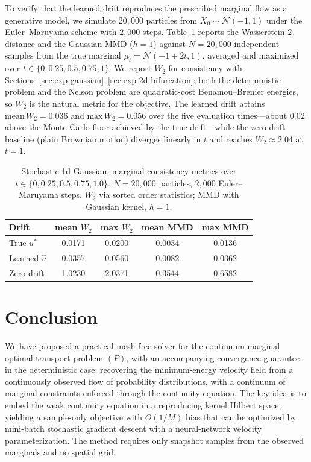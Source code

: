 \documentclass[11pt,leqno]{article}
\theoremstyle{plain}
\theoremstyle{remark}
\theoremstyle{definition}
\numberwithin{equation}{section}
\numberwithin{figure}{section}
\numberwithin{table}{section}
\begin{document}
To verify that the learned drift reproduces the prescribed marginal
flow as a generative model, we simulate $20{,}000$ particles from
$X_0\sim\mathcal{N}(-1,1)$ under the Euler--Maruyama scheme 
with $2{,}000$ steps.  Table~\ref{tab:marginal} reports the
Wasserstein-$2$ distance and the Gaussian MMD ($h=1$) against
$N=20{,}000$ independent samples from the true marginal
$\mu_t=\mathcal{N}(-1+2t,1)$, averaged and maximized over
$t\in\{0,0.25,0.5,0.75,1\}$.  We report $W_2$ for consistency with
Sections~\ref{sec:exp-gaussian}--\ref{sec:exp-2d-bifurcation}: both the
deterministic problem and the Nelson problem are quadratic-cost
Benamou--Brenier energies, so $W_2$ is the natural metric for the
objective.  The learned drift attains
$\mathrm{mean}\,W_2=0.036$ and $\mathrm{max}\,W_2=0.056$ over the five
evaluation times---about $0.02$ above the Monte Carlo floor achieved
by the true drift---while the zero-drift baseline (plain Brownian
motion) diverges linearly in $t$ and reaches $W_2\approx 2.04$ at
$t=1$.

\begin{table}[htbp]
\centering
\caption{Stochastic 1d Gaussian: marginal-consistency metrics over
$t\in\{0,0.25,0.5,0.75,1.0\}$.
$N=20{,}000$ particles, $2{,}000$ Euler--Maruyama steps.
$W_2$ via sorted order statistics; MMD with Gaussian kernel, $h=1$.}
\label{tab:marginal}
\begin{tabular}{lcccc}
\toprule
Drift & mean $W_2$ & max $W_2$ & mean MMD & max MMD \\
\midrule
True $u^*$       & 0.0171 & 0.0200 & 0.0034 & 0.0136 \\
Learned $\hat u$ & 0.0357 & 0.0560 & 0.0082 & 0.0362 \\
Zero drift       & 1.0230 & 2.0371 & 0.3544 & 0.6582 \\
\bottomrule
\end{tabular}
\end{table}



\section{Conclusion}
\label{sec:conclusion}

We have proposed a practical mesh-free solver for the
continuum-marginal optimal transport problem $(P)$, with an
accompanying convergence guarantee in the deterministic case:
recovering the
minimum-energy velocity field from a continuously observed flow of probability
distributions, with a continuum of marginal constraints enforced through the
continuity equation.
The key idea is to embed the weak continuity equation in a reproducing kernel
Hilbert space, yielding a sample-only objective with $O(1/M)$ bias that can be optimized
by mini-batch stochastic gradient descent with a neural-network velocity
parameterization.
The method requires only snapshot samples from the observed marginals and no
spatial grid.
\end{document}
